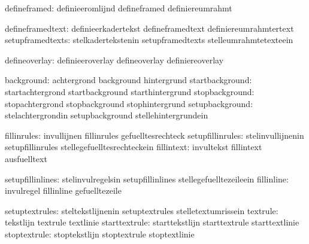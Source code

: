                  defineframed:  definieeromlijnd             defineframed
                                definiereumrahmt

             defineframedtext:  definieerkadertekst          defineframedtext
                                definiereumrahmtertext
             setupframedtexts:  stelkadertekstenin           setupframedtexts
                                stelleumrahmtetexteein

                defineoverlay:  definieeroverlay             defineoverlay
                                definiereoverlay

                   background:  achtergrond                  background
                                hintergrund
              startbackground:  startachtergrond             startbackground
                                starthintergrund
               stopbackground:  stopachtergrond              stopbackground
                                stophintergrund
              setupbackground:  stelachtergrondin            setupbackground
                                stellehintergrundein

                  fillinrules:  invullijnen                  fillinrules
                                gefuelltesrechteck
             setupfillinrules:  stelinvullijnenin            setupfillinrules
                                stellegefuelltesrechteckein
                   fillintext:  invultekst                   fillintext
                                ausfuelltext

             setupfillinlines:  stelinvulregelsin            setupfillinlines
                                stellegefuelltezeileein
                   fillinline:  invulregel                   fillinline
                                gefuelltezeile

               setuptextrules:  steltekstlijnenin            setuptextrules
                                stelletextumrissein
                     textrule:  tekstlijn                    textrule
                                textlinie
                starttextrule:  starttekstlijn               starttextrule
                                starttextlinie
                 stoptextrule:  stoptekstlijn                stoptextrule
                                stoptextlinie

